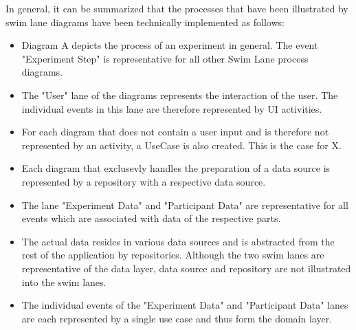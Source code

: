 In general, it can be summarized that the processes that have been illustrated by swim lane diagrams have been technically implemented as follows:
\begin{itemize}
    \item Diagram A depicts the process of an experiment in general. The event "Experiment Step" is representative for all other Swim Lane process diagrams.
    \item The "User" lane of the diagrams represents the interaction of the user. The individual events in this lane are therefore represented by UI activities.
    \item For each diagram that does not contain a user input and is therefore not represented by an activity, a UseCase is also created. This is the case for X.
    \item Each diagram that exclusevly handles the preparation of a data source is represented by a repository with a respective data source.
    \item The lane "Experiment Data" and "Participant Data" are representative for all events which are associated with data of the respective parts. 
    \item The actual data resides in various data sources and is abstracted from the rest of the application by repositories. Although the two swim lanes are representative of the data layer, data source and repository are not illustrated into the swim lanes.
    \item The individual events of the "Experiment Data" and "Participant Data" lanes are each represented by a single use case and thus form the domain layer.
\end{itemize}








